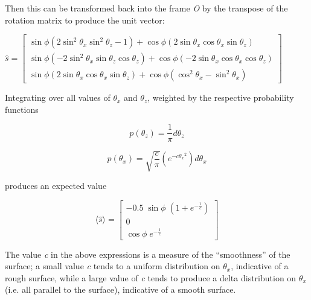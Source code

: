          Then this can be transformed back into the frame
         \textit{O} by the transpose of the rotation matrix to produce the
         unit vector:

          $\hat{s}=\left[\begin{matrix}\sin \phi (2\sin ^{2}\theta
         _{x}\sin ^{2}\theta _{z}-1)+\cos \phi (2\sin \theta _{x}\cos \theta
         _{x}\sin \theta _{z})\\\sin \phi (-2\sin ^{2}\theta _{x}\sin \theta
         _{z}\cos \theta _{z})+\cos \phi (-2\sin \theta _{x}\cos \theta _{x}\cos
         \theta _{z})\\\sin \phi (2\sin \theta _{x}\cos \theta _{x}\sin \theta
         _{z})+\cos \phi (\cos ^{2}\theta _{x}-\sin ^{2}\theta
         _{x})\end{matrix}\right]$

         \bigskip

         Integrating over all values of $\theta_x$ and $\theta_z$, weighted
         by the respective probability
         functions

         \begin{equation*}
         p(\theta_z) = \frac{1}{\pi} d\theta_z
         \end{equation*}

         \begin{equation*}
         p(\theta_x) = \sqrt {\frac{c}{\pi}} \left( e^{-c {\theta_x}^2} \right) d \theta_x
         \end{equation*}

          produces an expected value

         \begin{equation}
           \langle \hat{s}\rangle =\left[\begin{matrix}-0.5\;\sin \phi
           \;\left(1+e^{-\frac{1}{c}}\right)\\0\\\cos \phi
           \;e^{-\frac{1}{c}}\end{matrix}\right]
           \label{eqn:s_hat_average}
        \end{equation}

         The value \textit{c} in the above expressions is a measure of the
         ``smoothness'' of the surface; a small value \textit{c} tends to a
         uniform distribution on $\theta_x$, indicative of a rough surface,
         while a large value of \textit{c} tends to produce a delta distribution
         on $\theta_x$ (i.e. all parallel to the surface), indicative of a smooth
         surface.


